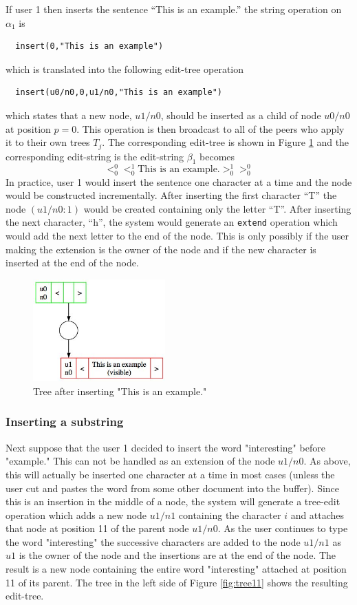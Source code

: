 \documentclass{amsart}
\begin{document}
If user 1 then inserts the sentence ``This is an example.'' 
the string operation on $\alpha_1$ is
\begin{verbatim}
  insert(0,"This is an example")
\end{verbatim}
which is translated into the following edit-tree operation
\begin{verbatim}
  insert(u0/n0,0,u1/n0,"This is an example")
\end{verbatim}
which states that a new node, $u1/n0$, should be inserted as a child of
node $u0/n0$ at position $p=0$. This operation is then broadcast to all of the
peers who apply it to their own trees $T_j$.
The corresponding edit-tree is shown in Figure \ref{fig:tree0} and the
corresponding edit-string is
the edit-string $\beta_1$ becomes
\[
<_0^0 <_0^1 \text{This  is  an  example.}>_0^1 >_0^0
\]
In practice, user 1 would insert the sentence one character at a time
and the node would be constructed incrementally.
After inserting the first character ``T'' the node $(u1/n0:1)$ would be created
containing only the letter ``T''. After inserting the next character, ``h'',
the system would generate an {\tt extend} operation which would add the
next letter to the end of the node. This is only possibly if the user making
the extension is the owner of the node and if the new character is inserted
at the end of the node.



\begin{figure}[h]
\centering
\includegraphics[width=2.0in]{tree1zz.jpg}
\caption{Tree after inserting "This is an example.\label{fig:tree0}"}
\end{figure}

\subsubsection{Inserting a substring}
Next suppose that the user 1 decided to insert the word "interesting"
before "example."  This can not be handled as an extension of the node
$u1/n0$.  As above, this will actually be inserted one character at a time
in most cases (unless the user cut and pastes the word from some other
document into the buffer). Since this is an insertion in the middle of a node,
the system will generate a tree-edit operation which adds a new node $u1/n1$
containing the character $i$ and attaches that node at position 11 of the
parent node $u1/n0$.  As the user continues to type the word "interesting"
the successive characters are added to the node $u1/n1$ as $u1$ is the owner
of the node and the insertions are at the end of the node. The result
is a new node containing the entire word "interesting" attached at position
11 of its parent. The tree in the left side of Figure \ref{fig:tree11}
shows the resulting edit-tree.
\end{document}
